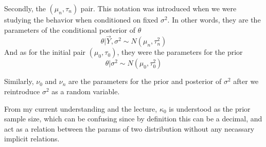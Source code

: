 Secondly, the $(\mu_n, \tau_n)$ pair. This notation was introduced when we were studying the behavior when conditioned on fixed $\sigma^2$. In other words, they are the parameters of the conditional posterior of $\theta$
\begin{equation*}
    \theta | \vec{Y}, \sigma^2 \sim N(\mu_n, \tau_n^2)
\end{equation*}
And as for the initial pair $(\mu_0, \tau_0)$, they were the parameters for the prior
\begin{equation*}
    \theta | \sigma^2 \sim N(\mu_0, \tau_0^2)
\end{equation*}

Similarly, $\nu_0$ and $\nu_n$ are the parameters for the prior and posterior of $\sigma^2$ after we reintroduce $\sigma^2$ as a random variable. 

From my current understanding and the lecture, $\kappa_0$ is understood as the prior sample size, which can be confusing since by definition this can be a decimal, and act as a relation between the params of two distribution without any necassary implicit relations.